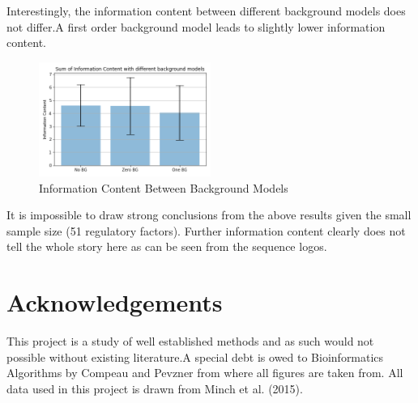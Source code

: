 \documentclass[12pt]{scrartcl} %
\begin{document}
Interestingly, the information content between different background models does not differ.A first order background model
leads to slightly lower information content. 
\begin{figure}[h!]
    \centering
    \includegraphics[width=0.5\textwidth]{Pictures/ic_content.png}
    \caption{Information Content Between Background Models}
\end{figure}
It is impossible to draw strong conclusions from the above results given the small sample size (51 regulatory factors). Further information
content clearly does not tell the whole story here as can be seen from the sequence logos. 
\section{Acknowledgements}
This project is a study of well established methods and as such would not possible without existing literature.A special debt is owed
to Bioinformatics Algorithms by Compeau and Pevzner from where all figures are taken from. All data used in this project is drawn from 
Minch et al. (2015). 
\end{document}
